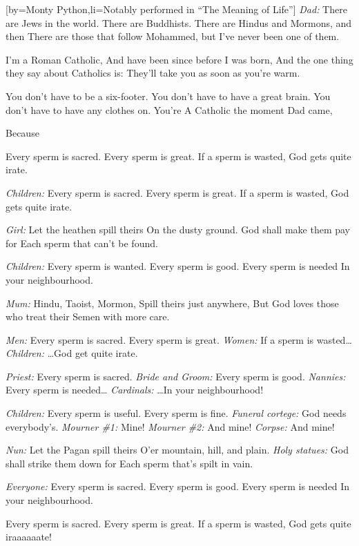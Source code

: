 [by={Monty Python},li={Notably performed in ``The Meaning of Life''}]
\beginverse
\textit{Dad:}
There are Jews in the world.
There are Buddhists.
There are Hindus and Mormons, and then
There are those that follow Mohammed, but
I've never been one of them.
\endverse

\beginverse
I'm a Roman Catholic,
And have been since before I was born,
And the one thing they say about Catholics is:
They'll take you as soon as you're warm.
\endverse

\beginverse
You don't have to be a six-footer.
You don't have to have a great brain.
You don't have to have any clothes on. You're
A Catholic the moment Dad came,
\endverse

\beginverse
Because
\endverse

\beginchorus
Every sperm is sacred.
Every sperm is great.
If a sperm is wasted,
God gets quite irate.
\endchorus

\beginchorus
\textit{Children:}
Every sperm is sacred.
Every sperm is great.
If a sperm is wasted,
God gets quite irate.
\endchorus

\beginverse
\textit{Girl:}
Let the heathen spill theirs
On the dusty ground.
God shall make them pay for
Each sperm that can't be found.
\endverse

\beginchorus
\textit{Children:}
Every sperm is wanted.
Every sperm is good.
Every sperm is needed
In your neighbourhood.
\endchorus

\beginverse
\textit{Mum:}
Hindu, Taoist, Mormon,
Spill theirs just anywhere,
But God loves those who treat their
Semen with more care.
\endverse

\beginchorus
\textit{Men:}
Every sperm is sacred.
Every sperm is great.
\textit{Women:}
If a sperm is wasted\dots
\textit{Children:}
\dots God get quite irate.
\endchorus

\beginverse
\textit{Priest:}
Every sperm is sacred.
\textit{Bride and Groom:}
Every sperm is good.
\textit{Nannies:}
Every sperm is needed\dots
\textit{Cardinals:}
\dots In your neighbourhood!
\endverse

\beginverse
\textit{Children:}
Every sperm is useful.
Every sperm is fine.
\textit{Funeral cortege:}
God needs everybody's.
\textit{Mourner \#1:}
Mine!
\textit{Mourner \#2:}
And mine!
\textit{Corpse:}
And mine!
\endverse

\beginverse
\textit{Nun:}
Let the Pagan spill theirs
O'er mountain, hill, and plain.
\textit{Holy statues:}
God shall strike them down for
Each sperm that's spilt in vain.
\endverse

\beginchorus
\textit{Everyone:}
Every sperm is sacred.
Every sperm is good.
Every sperm is needed
In your neighbourhood.

Every sperm is sacred.
Every sperm is great.
If a sperm is wasted,
God gets quite iraaaaaate!
\endchorus
\endsong
